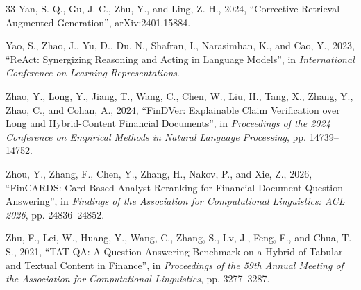 \begin{thebibliography}{33}
Yan, S.-Q., Gu, J.-C., Zhu, Y., and Ling, Z.-H., 2024, ``Corrective Retrieval Augmented Generation'', arXiv:2401.15884.

Yao, S., Zhao, J., Yu, D., Du, N., Shafran, I., Narasimhan, K., and Cao, Y., 2023, ``ReAct: Synergizing Reasoning and Acting in Language Models'', in \emph{International Conference on Learning Representations}.

Zhao, Y., Long, Y., Jiang, T., Wang, C., Chen, W., Liu, H., Tang, X., Zhang, Y., Zhao, C., and Cohan, A., 2024, ``FinDVer: Explainable Claim Verification over Long and Hybrid-Content Financial Documents'', in \emph{Proceedings of the 2024 Conference on Empirical Methods in Natural Language Processing}, pp. 14739--14752.

Zhou, Y., Zhang, F., Chen, Y., Zhang, H., Nakov, P., and Xie, Z., 2026, ``FinCARDS: Card-Based Analyst Reranking for Financial Document Question Answering'', in \emph{Findings of the Association for Computational Linguistics: ACL 2026}, pp. 24836--24852.

Zhu, F., Lei, W., Huang, Y., Wang, C., Zhang, S., Lv, J., Feng, F., and Chua, T.-S., 2021, ``TAT-QA: A Question Answering Benchmark on a Hybrid of Tabular and Textual Content in Finance'', in \emph{Proceedings of the 59th Annual Meeting of the Association for Computational Linguistics}, pp. 3277--3287.

\end{thebibliography}
